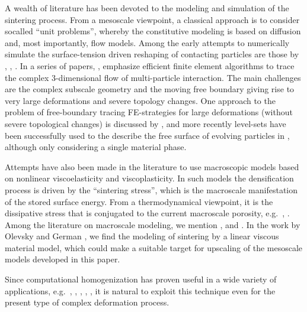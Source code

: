 \documentclass[12pt,a4paper]{article}
\begin{document}
A wealth of literature has been devoted to the modeling and simulation of the sintering process.
From a mesoscale viewpoint, a classical approach is to consider socalled ``unit problems'', whereby the constitutive modeling is based on diffusion and, most importantly, flow models.
Among the early attempts to numerically simulate the surface-tension driven reshaping of contacting particles are those by \cite{jagota_micromechanical_1988}, \cite{jagota_micromechanical_1988-1}, \cite{van_de_vorst_integral_1993}.
In a series of papers, \cite{zhou_three-dimensional_1998}, \cite{zhou_assessment_2001} emphasize efficient finite element algorithms to trace the complex 3-dimensional flow of multi-particle interaction.
The main challenges  are the complex subscale geometry and the moving free boundary giving rise to very large deformations and severe topology changes.
One approach to the problem of free-boundary tracing FE-strategies for large deformations (without severe topological changes) is discussed by \cite{dettmer_computational_2006}, and more recently level-sets have been successfully used to the describe the free surface of evolving particles in \cite{pino_munoz_direct_2013}, although only considering a single material phase.


Attempts have also been made in the literature to use macroscopic models based on nonlinear viscoelasticity and viscoplasticity.
In such models the densification process is driven by the ``sintering stress'', which is the macroscale manifestation of the stored surface energy.
From a thermodynamical viewpoint, it is the dissipative stress that is conjugated to the current macroscale porosity, e.g.\ \cite{reid_continuum_1990}, \cite{mahler_modelling_2000}.
Among the literature on macroscale modeling, we mention \cite{svoboda_model_1996}, \cite{xu_micromechanical_1997} and \cite{lu_porosity_2001}.
In the work by Olevsky and German \cite{olevsky_theory_1998}, \cite{olevsky_effect_2000} we find the modeling of sintering by a linear viscous material model, which could make a suitable target for upscaling of the mesoscale models developed in this paper.



Since computational homogenization has proven useful in a wide variety of applications, e.g.\ \cite{klinge_application_2012}, \cite{miehe_computational_2002}, \cite{oskay_eigendeformation-based_2007}, \cite{sandstrom_variationally_2012}, \cite{zohdi_model_2001}, it is natural to exploit this technique even for the present type of complex deformation process.
\end{document}
